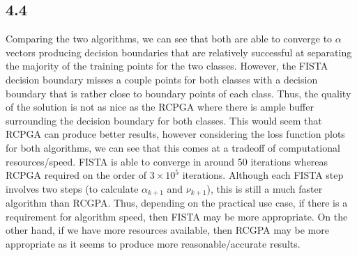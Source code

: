 \documentclass[12pt]{article}
\begin{document}
\subsection*{4.4}
Comparing the two algorithms, we can see that both are able to converge to $\alpha$ vectors producing decision boundaries that are relatively successful at separating the majority of the training points for the two classes. However, the FISTA decision boundary misses a couple points for both classes with a decision boundary that is rather close to boundary points of each class. Thus, the quality of the solution is not as nice as the RCPGA where there is ample buffer surrounding the decision boundary for both classes. This would seem that RCPGA can produce better results, however considering the loss function plots for both algorithms, we can see that this comes at a tradeoff of computational resources/speed. FISTA is able to converge in around 50 iterations whereas RCPGA required on the order of $3\times 10^{5}$ iterations. Although each FISTA step involves two steps (to calculate $\alpha_{k+1}$ and $\nu_{k+1}$), this is still a much faster algorithm than RCGPA. Thus, depending on the practical use case, if there is a requirement for algorithm speed, then FISTA may be more appropriate. On the other hand, if we have more resources available, then RCGPA may be more appropriate as it seems to produce more reasonable/accurate results.
\end{document}
